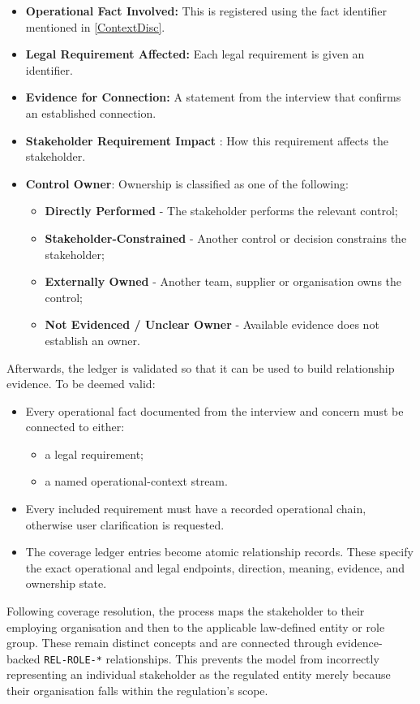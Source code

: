 \begin{itemize}
    \item \textbf{Operational Fact Involved:} This is registered using the fact identifier mentioned in \ref{ContextDisc}.
    \item \textbf{Legal Requirement Affected:} Each legal requirement is given an identifier.
    \item \textbf{Evidence for Connection: } A statement from the interview that confirms an established connection.
    \item \textbf{Stakeholder Requirement Impact} : How this requirement affects the stakeholder.
    \item \textbf{Control Owner}: Ownership is classified as one of the following:
        \begin{itemize}
            \item \textbf{Directly Performed} - The stakeholder performs the relevant control;
            \item \textbf{Stakeholder-Constrained} - Another control or decision constrains the stakeholder;
            \item \textbf{Externally Owned} - Another team, supplier or organisation owns the control;
            \item \textbf{Not Evidenced / Unclear Owner } - Available evidence does not establish an owner.
        \end{itemize}
\end{itemize}
Afterwards, the ledger is validated so that it can be used to build relationship evidence. To be deemed valid:
\begin{itemize}
    \item Every operational fact documented from the interview  and concern must be connected to either:
    \begin{itemize}
        \item a legal requirement;
        \item a named operational-context stream.
    \end{itemize}
    \item Every included requirement must have a recorded operational chain, otherwise user clarification is requested.
    \item The coverage ledger entries become atomic relationship records. These specify the exact operational and legal endpoints, direction, meaning, evidence, and ownership state.
\end{itemize}

Following coverage resolution, the process maps the stakeholder to their employing organisation and then to the applicable law-defined entity or role group. These remain distinct concepts and are connected through evidence-backed \texttt{REL-ROLE-*} relationships. This prevents the model from incorrectly representing an individual stakeholder as the regulated entity merely because their organisation falls within the regulation's scope.

